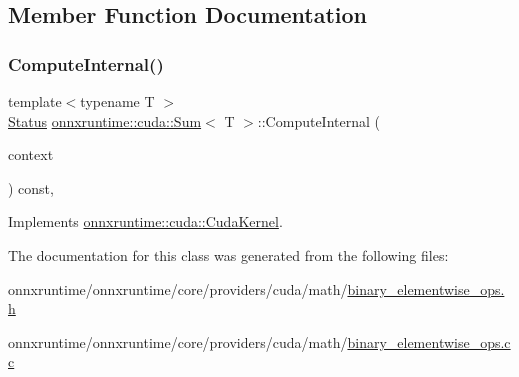 \subsection{Member Function Documentation}
\mbox{\label{classonnxruntime_1_1cuda_1_1Sum_a07a1e4385aad90a558f83fc7abf5e93b}} 
\subsubsection{\texorpdfstring{Compute\+Internal()}{ComputeInternal()}}
{\footnotesize\ttfamily template$<$typename T $>$ \\
\mbox{\hyperlink{classonnxruntime_1_1common_1_1Status}{Status}} \mbox{\hyperlink{classonnxruntime_1_1cuda_1_1Sum}{onnxruntime\+::cuda\+::\+Sum}}$<$ T $>$\+::Compute\+Internal (\begin{DoxyParamCaption}\item[{\mbox{\hyperlink{classonnxruntime_1_1OpKernelContext}{Op\+Kernel\+Context}} $\ast$}]{context }\end{DoxyParamCaption}) const\hspace{0.3cm}{\ttfamily [override]}, {\ttfamily [virtual]}}



Implements \mbox{\hyperlink{classonnxruntime_1_1cuda_1_1CudaKernel_aca7af04ae448017d6023d30bba231ebb}{onnxruntime\+::cuda\+::\+Cuda\+Kernel}}.



The documentation for this class was generated from the following files\+:\begin{DoxyCompactItemize}
\item 
onnxruntime/onnxruntime/core/providers/cuda/math/\mbox{\hyperlink{binary__elementwise__ops_8h}{binary\+\_\+elementwise\+\_\+ops.\+h}}\item 
onnxruntime/onnxruntime/core/providers/cuda/math/\mbox{\hyperlink{binary__elementwise__ops_8cc}{binary\+\_\+elementwise\+\_\+ops.\+cc}}\end{DoxyCompactItemize}
